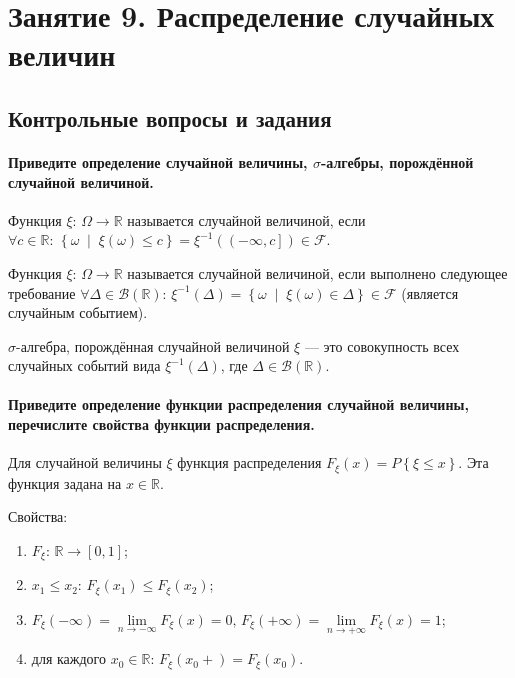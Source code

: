 \chapter*{Занятие 9. Распределение случайных величин}

\section*{Контрольные вопросы и задания}

\subsubsection*{Приведите определение случайной величины, $ \sigma $-алгебры, порождённой случайной величиной.}

Функция $ \xi: \, \Omega \rightarrow \mathbb{R}$ называется случайной величиной,
если
$ \forall c \in \mathbb{R}: \,
\left\{ \omega \; \middle| \; \xi \left( \omega \right) \leq c \right\} =
\xi^{-1} \left( \left( - \infty, c \right] \right) \in
\mathcal{F} $.

Функция $ \xi: \, \Omega \rightarrow \mathbb{R}$ называется случайной величиной,
если выполнено следующее требование
$ \forall \Delta \in \mathcal{B} \left( \mathbb{R} \right): \,
\xi^{-1} \left( \Delta \right) =
\left\{ \omega \; \middle| \; \xi \left( \omega \right) \in \Delta \right\} \in
\mathcal{F}$
(является случайным событием).

$ \sigma $-алгебра,
порождённая случайной величиной $ \xi $ ---
это совокупность всех случайных событий вида $ \xi^{-1} \left( \Delta \right) $, где $ \Delta \in \mathcal{B} \left( \mathbb{R} \right) $.

\subsubsection*{Приведите определение функции распределения случайной величины, перечислите свойства функции распределения.}

Для случайной величины $ \xi $ функция распределения $F_{ \xi } \left( x \right) = P \left\{ \xi \leq x \right\} $.
Эта функция задана на $x \in \mathbb{R}$.

Свойства:
\begin{enumerate}
\item $F_{ \xi }: \, \mathbb{R} \rightarrow \left[ 0, 1 \right] $;
\item $x_1 \leq x_2: \, F_{ \xi } \left( x_1 \right) \leq F_{ \xi } \left( x_2 \right) $;
\item $F_{ \xi } \left( - \infty \right) = \lim \limits_{n \to - \infty } F_{ \xi } \left( x \right) = 0, \,
F_{ \xi } \left( + \infty \right) = \lim \limits_{n \to + \infty } F_{ \xi } \left( x \right) = 1$;
\item для каждого $x_0 \in \mathbb{R}: \, F_{ \xi } \left( x_0 + \right) = F_{ \xi } \left( x_0 \right) $.
\end{enumerate}

